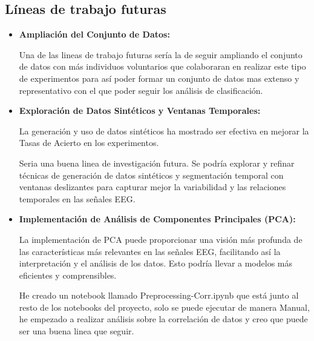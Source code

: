 \subsection{Líneas de trabajo futuras}


\begin{itemize}
	
	\item
	\textbf{Ampliación del Conjunto de Datos:}
	
	Una de las lineas de trabajo futuras sería la de seguir ampliando el conjunto de datos con más individuos voluntarios que colaboraran en realizar este tipo de experimentos para así poder formar un conjunto de datos mas extenso y representativo con el que poder seguir los análisis de clasificación.
	
	\item
	\textbf{Exploración de Datos Sintéticos y Ventanas Temporales:}
	
	La generación y uso de datos sintéticos ha mostrado ser efectiva en mejorar la Tasas de Acierto en los experimentos.
	
	Seria una buena linea de investigación futura. Se podría explorar y refinar técnicas de generación de datos sintéticos y segmentación temporal con ventanas deslizantes para capturar mejor la variabilidad y las relaciones temporales en las señales EEG.
	
	\item
	\textbf{Implementación de Análisis de Componentes Principales (PCA):}

	La implementación de PCA puede proporcionar una visión más profunda de las características más relevantes en las señales EEG, facilitando así la interpretación y el análisis de los datos. 
	Esto podría llevar a modelos más eficientes y comprensibles.	
	
	He creado un notebook llamado Preprocessing-Corr.ipynb que está junto al resto de los notebooks del proyecto, solo se puede ejecutar de manera Manual, he empezado a realizar análisis sobre la correlación de datos y creo que puede ser una buena linea que seguir.
	
	
	
\end{itemize}	